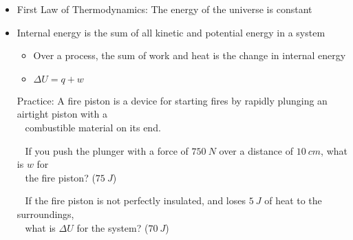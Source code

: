 \documentclass[12pt, openany, letterpaper]{memoir}
\begin{document}
\begin{itemize}
\begin{itemize}
	      \end{itemize}
	\item First Law of Thermodynamics: The energy of the universe is constant
	\item Internal energy is the sum of all kinetic and potential energy in a system
	      \begin{itemize}
		      \item Over a process, the sum of work and heat is the change in internal energy
		      \item $\Delta U=q+w$
	      \end{itemize}
	      Practice: A fire piston is a device for starting fires by rapidly plunging an airtight piston with a\\
	      ~\hphantom{Practice: } combustible material on its end.

	      ~\hphantom{Practice:} If you push the plunger with a force of $750~N$ over a distance of $10~cm$, what is $w$ for\\
	      ~\hphantom{Practice: } the fire piston? ($75~J$)

	      ~\hphantom{Practice:} If the fire piston is not perfectly insulated, and loses $5~J$ of heat to the surroundings,\\
	      ~\hphantom{Practice: } what is $\Delta U$ for the system? ($70~J$)
\end{itemize}
\end{document}
